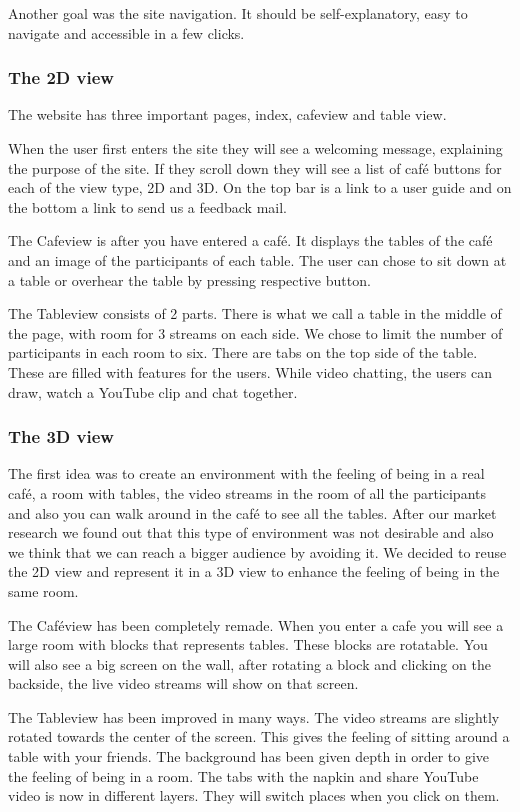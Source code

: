 \documentclass[12pt, titlepage]{article}
\begin{document}
Another goal was the site navigation. It should be self-explanatory, easy to navigate and accessible in a few clicks.
\subsubsection{The 2D view}
The website has three important pages, index, cafeview and table view.

When the user first enters the site they will see a welcoming message, explaining the purpose of the site. If they scroll down they will see a list of café buttons for each of the view type, 2D and 3D. On the top bar is a link to a user guide and on the bottom a link to send us a feedback mail.

The Cafeview is after you have entered a café. It displays the tables of the café and an image of the participants of each table. The user can chose to sit down at a table or overhear the table by pressing respective button.

The Tableview consists of 2 parts. There is what we call a table in the middle of the page, with room for 3 streams on each side. We chose to limit the number of participants in each room to six. There are tabs on the top side of the table. These are filled with features for the users. While video chatting, the users can draw, watch a YouTube clip and chat together. 
\subsubsection{The 3D view}
The first idea was to create an environment with the feeling of being in a real café, a room with tables, the video streams in the room of all the participants and also you can walk around in the café to see all the tables. After our market research we found out that this type of environment was not desirable and also we think that we can reach a bigger audience by avoiding it. We decided to reuse the 2D view and represent it in a 3D view to enhance the feeling of being in the same room. 

The Caféview has been completely remade. When you enter a cafe you will see a large room with blocks that represents tables. These blocks are rotatable. You will also see a big screen on the wall, after rotating a block and clicking on the backside,  the live video streams will show on that screen.

The Tableview has been improved in many ways. The video streams are slightly rotated towards the center of the screen. This gives the feeling of sitting around a table with your friends. The background has been given depth in order to give the feeling of being in a room. The tabs with the napkin and share YouTube video is now in different layers. They will switch places when you click on them.
\end{document}
